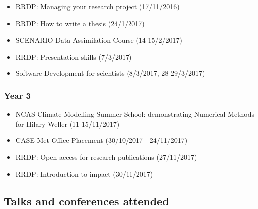 \documentclass[11pt,a4paper]{article}
\begin{document}
\begin{itemize}
  \item RRDP: Managing your research project (17/11/2016)
  \item RRDP: How to write a thesis (24/1/2017)
  \item SCENARIO Data Assimilation Course (14-15/2/2017)
  \item RRDP: Presentation skills (7/3/2017)
  \item Software Development for scientists (8/3/2017, 28-29/3/2017)
\end{itemize}

\subsubsection*{Year 3}

\begin{itemize}
  \item NCAS Climate Modelling Summer School: demonstrating Numerical Methods for Hilary Weller (11-15/11/2017)
  \item CASE Met Office Placement (30/10/2017 - 24/11/2017)
  \item RRDP: Open access for research publications (27/11/2017)
  \item RRDP: Introduction to impact (30/11/2017)
\end{itemize}

\subsection*{Talks and conferences attended}
\end{document}
